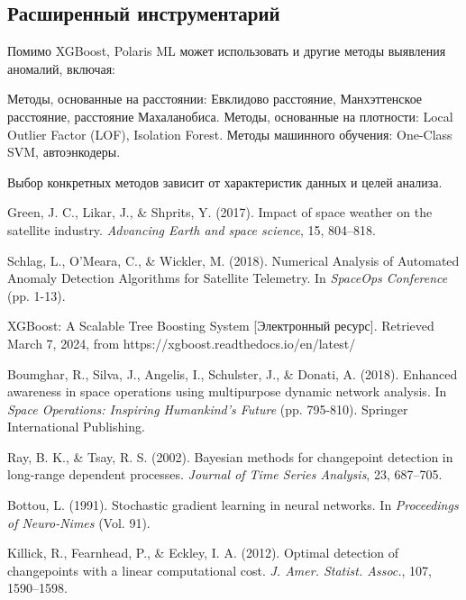\documentclass[12pt, a4paper]{extreport}
\begin{document}
\subsection{Расширенный инструментарий}

Помимо XGBoost, Polaris ML может использовать и другие методы выявления аномалий, включая:

Методы, основанные на расстоянии: Евклидово расстояние, Манхэттенское расстояние, расстояние Махаланобиса.
Методы, основанные на плотности: Local Outlier Factor (LOF), Isolation Forest.
Методы машинного обучения: One-Class SVM, автоэнкодеры.

Выбор конкретных методов зависит от характеристик данных и целей анализа.

\newpage 

\begin{thebibliography}{99}

    Green, J. C., Likar, J., \& Shprits, Y. (2017). Impact of space weather on the satellite industry. \textit{Advancing Earth and space science}, 15, 804--818.

    Schlag, L., O'Meara, C., \& Wickler, M. (2018). Numerical Analysis of Automated Anomaly Detection Algorithms for Satellite Telemetry. In \textit{SpaceOps Conference} (pp. 1-13).

    XGBoost: A Scalable Tree Boosting System [Электронный ресурс]. Retrieved March 7, 2024, from https://xgboost.readthedocs.io/en/latest/

    Boumghar, R., Silva, J., Angelis, I., Schulster, J., \& Donati, A. (2018). Enhanced awareness in space operations using multipurpose dynamic network analysis. In \textit{Space Operations: Inspiring Humankind's Future} (pp. 795-810). Springer International Publishing.

    Ray, B. K., \& Tsay, R. S. (2002). Bayesian methods for changepoint detection in long-range dependent processes. \textit{Journal of Time Series Analysis}, 23, 687--705.

    Bottou, L. (1991). Stochastic gradient learning in neural networks. In \textit{Proceedings of Neuro-Nimes} (Vol. 91).

    Killick, R., Fearnhead, P., \& Eckley, I. A. (2012). Optimal detection of changepoints with a linear computational cost. \textit{J. Amer. Statist. Assoc.}, 107, 1590--1598.

\end{thebibliography}
\end{document}
